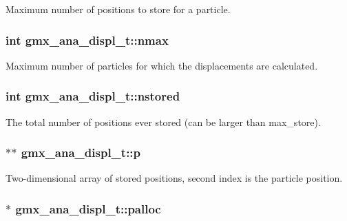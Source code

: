 \-Maximum number of positions to store for a particle. \hypertarget{structgmx__ana__displ__t_a9e7bad0a0b5b581f71d3f4ec2482ce9c}{
\subsubsection[{nmax}]{\setlength{\rightskip}{0pt plus 5cm}int {\bf gmx\-\_\-ana\-\_\-displ\-\_\-t\-::nmax}}}\label{structgmx__ana__displ__t_a9e7bad0a0b5b581f71d3f4ec2482ce9c}
\-Maximum number of particles for which the displacements are calculated. \hypertarget{structgmx__ana__displ__t_a0efe5ca7513a08868925634265da677c}{
\subsubsection[{nstored}]{\setlength{\rightskip}{0pt plus 5cm}int {\bf gmx\-\_\-ana\-\_\-displ\-\_\-t\-::nstored}}}\label{structgmx__ana__displ__t_a0efe5ca7513a08868925634265da677c}
\-The total number of positions ever stored (can be larger than {\ttfamily max\-\_\-store}). \hypertarget{structgmx__ana__displ__t_a1d95edacacd5dd34716f64b77f5bdce1}{
\subsubsection[{p}]{$\ast$$\ast$ {\bf gmx\-\_\-ana\-\_\-displ\-\_\-t\-::p}}}\label{structgmx__ana__displ__t_a1d95edacacd5dd34716f64b77f5bdce1}
\-Two-\/dimensional array of stored positions, second index is the particle position. \hypertarget{structgmx__ana__displ__t_a0efea6583ff758c9657aead87625a1cb}{
\subsubsection[{palloc}]{$\ast$ {\bf gmx\-\_\-ana\-\_\-displ\-\_\-t\-::palloc}}}\label{structgmx__ana__displ__t_a0efea6583ff758c9657aead87625a1cb}
